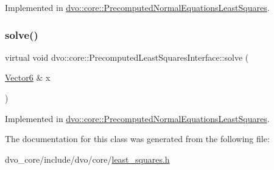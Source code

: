 Implemented in \mbox{\hyperlink{classdvo_1_1core_1_1_precomputed_normal_equations_least_squares_a5eb65ee043d392def0ab917ec18cf6ef}{dvo\+::core\+::\+Precomputed\+Normal\+Equations\+Least\+Squares}}.

\mbox{\label{classdvo_1_1core_1_1_precomputed_least_squares_interface_a036a293d0a53a7b019f8942776fb5d29}} 
\subsubsection{\texorpdfstring{solve()}{solve()}}
{\footnotesize\ttfamily virtual void dvo\+::core\+::\+Precomputed\+Least\+Squares\+Interface\+::solve (\begin{DoxyParamCaption}\item[{\mbox{\hyperlink{namespacedvo_1_1core_a05327f3312d32a301bce9fccda9e5807}{Vector6}} \&}]{x }\end{DoxyParamCaption})\hspace{0.3cm}{\ttfamily [pure virtual]}}



Implemented in \mbox{\hyperlink{classdvo_1_1core_1_1_precomputed_normal_equations_least_squares_a9749ed4314ae7ed7dbfa05c35a9e4a51}{dvo\+::core\+::\+Precomputed\+Normal\+Equations\+Least\+Squares}}.



The documentation for this class was generated from the following file\+:\begin{DoxyCompactItemize}
\item 
dvo\+\_\+core/include/dvo/core/\mbox{\hyperlink{least__squares_8h}{least\+\_\+squares.\+h}}\end{DoxyCompactItemize}
